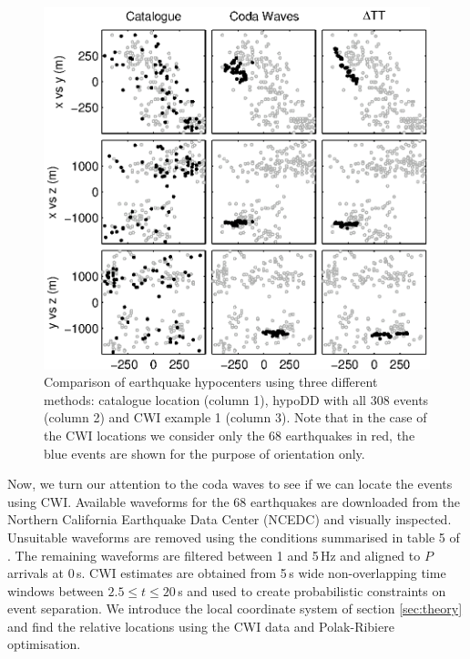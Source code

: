 \documentclass[extra]{gji}
\begin{document}
\begin{figure}
\includegraphics{diags/CalaverasLoc1_hypoDD_SVD.eps}
\caption{Comparison of earthquake hypocenters using three different
methods: catalogue location (column 1), hypoDD with all 308 events
(column 2) and CWI example 1 (column 3). Note that in the case of
the CWI locations we consider only the 68 earthquakes in red, the
blue events are shown for the purpose of orientation only.}
\label{fig-69Calaverasevents_eg1}
\end{figure}

Now, we turn our attention to the coda waves to see if we can locate
the events using CWI. Available waveforms for the 68 earthquakes are
downloaded from the Northern California Earthquake Data Center
(NCEDC) and visually inspected. Unsuitable waveforms are removed
using the conditions summarised in table 5 of
\citep{dr_Robinson11a}. The remaining waveforms are filtered between
1 and 5\,Hz and aligned  to $P$ arrivals at 0\,s. CWI estimates are
obtained from 5\,s wide non-overlapping time windows between $2.5
\leq t \leq 20$\,s and used to create probabilistic constraints on
event separation. We introduce the local coordinate system of
section \ref{sec:theory} and find the relative locations using the
CWI data and Polak-Ribiere optimisation.
\end{document}

